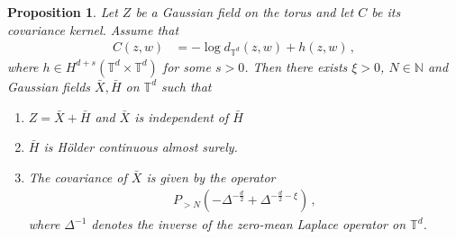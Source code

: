 \documentclass[11pt]{article}
\numberwithin{equation}{section}
\newtheorem{proposition}[theorem]{Proposition}
\theoremstyle{definition}
\newcommand{\N}{\mathbb{N}}
\def\T{\mathbb{T}}
\newcommand{\PNN}{ {P_{>N}} }
\begin{document}
\begin{proposition}\label{lem:coupling-2}
   Let $Z$ be a Gaussian field on the torus and let $C$ be its covariance kernel. Assume that
	\begin{align*}
	C(z,w) &= - \log d_{\T^d}(z,w) + h(z,w)\,,
\end{align*}	   
	where $h \in H^{d+s}(\T^d \times \T^d)$ for some $s > 0$.
    Then there exists $\xi>0$, $N \in \N$ and Gaussian fields $\bar{X},\bar{H}$ on $\T^d$ such that 
	\begin{enumerate}
	\item $Z = \bar X + \bar H$ and $\bar X$ is independent of $\bar H$
    \item $\bar{H}$ is Hölder continuous almost surely.
    \item The covariance of $\bar{X}$ is given by the operator
   \begin{align*}
     \PNN (-  \Delta^{-\frac{d}{2}} + \Delta^{-\frac{d}{2}-\xi})\,,
   \end{align*}
   where $\Delta^{-1}$ denotes the inverse of the zero-mean Laplace operator on $\T^d$.
	\end{enumerate}
\end{proposition}
\end{document}
